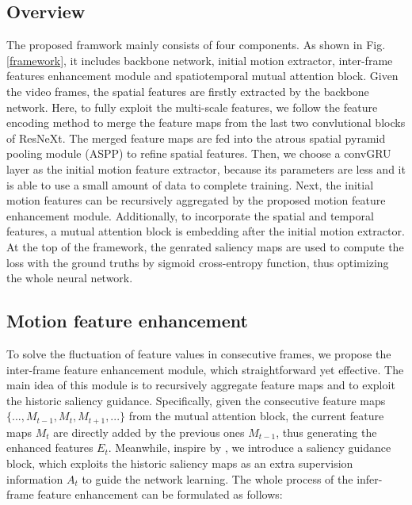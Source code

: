 \documentclass[12pt]{article}
\begin{document}
\subsection{Overview}

The proposed framwork mainly consists of four components. As shown in Fig.\ref{framework}, it includes backbone network, initial motion extractor, inter-frame features enhancement module and spatiotemporal mutual attention block. Given the video frames, the spatial features are firstly extracted by the backbone network. Here, to fully exploit the multi-scale features, we follow the feature encoding method \cite{fu2019dual} to merge the feature maps from the last two convlutional blocks of ResNeXt. The merged feature maps are fed into the atrous spatial pyramid pooling module (ASPP) \cite{chen2017rethinking} to refine spatial features. Then, we choose a convGRU layer as the initial motion feature extractor, because its parameters are less and it is able to use a small amount of data to complete training. Next, the initial motion features can be recursively aggregated by the proposed motion feature enhancement module. Additionally, to incorporate the spatial and temporal features, a mutual attention block is embedding after the initial motion extractor. At the top of the framework, the genrated saliency maps are used to compute the loss with the ground truths by sigmoid cross-entropy function, thus optimizing the whole neural network.  

\subsection{Motion feature enhancement}

To solve the fluctuation of feature values in consecutive frames, we propose the inter-frame feature enhancement module, which straightforward yet effective. The main idea of this module is to recursively aggregate feature maps and to exploit the historic saliency guidance. Specifically, given the consecutive feature maps $\{..., M_{t-1}, M_{t}, M_{t+1}, ...\}$ from the mutual attention block, the current feature maps $M_{t}$ are directly added by the previous ones $M_{t-1}$, thus generating the enhanced features $E_{t}$. Meanwhile, inspire by \cite{deng2018r3net}, we introduce a saliency guidance block, which exploits the historic saliency maps as an extra supervision information $A_t$ to guide the network learning. The whole process of the infer-frame feature enhancement can be formulated as follows:  
\end{document}
